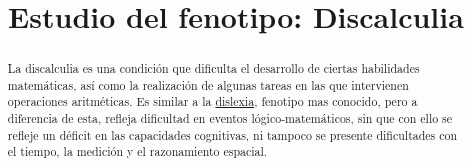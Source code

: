 \documentclass{bmcart}
\begin{document}
	\begin{frontmatter}
	
		\begin{fmbox}
			
			
			\title{Estudio del fenotipo: Discalculia}
			
			
			\author[
			  addressref={aff1},
			  email={ale.pas.mel@uma.es}
			]{ }
			
			\author[
			  addressref={aff1},
			  email={Acherd@uma.es}
			]{ }
			
			
			\address[id=aff1]{%
			  ,             %
			  ,          %
			  ,                              %
			}
		
		\end{fmbox}%
		
		\begin{abstractbox}
		
			\begin{abstract} %
			
			La discalculia es una condición que dificulta el desarrollo de ciertas habilidades matemáticas, así como  la realización de algunas tareas en las que intervienen operaciones aritméticas. Es similar a la \href{https://hpo.jax.org/app/browse/term/HP:0010522}{dislexia}, fenotipo mas conocido, pero a diferencia de esta,  refleja dificultad en  eventos lógico-matemáticos, sin que con ello se refleje un déficit en las capacidades cognitivas, ni tampoco se presente dificultades con el tiempo, la medición y el razonamiento espacial.
			

\end{abstract}
\end{abstractbox}
\end{frontmatter}
\end{document}
